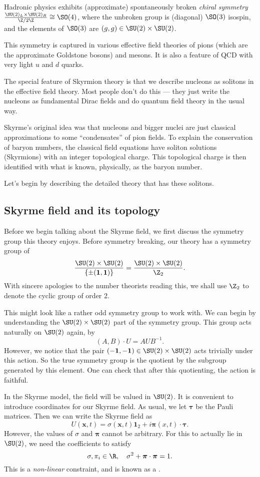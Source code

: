 \documentclass[a4paper]{article}
\begin{document}
Hadronic physics exhibits (approximate) spontaneously broken \emph{chiral symmetry} $\frac{\SU(2)_L \times \SU(2)_R}{\Z/2\Z} \cong \SO(4)$, where the unbroken group is (diagonal) $\SO(3)$ isospin, and the elements of $\SO(3)$ are $(g, g) \in \SU(2) \times \SU(2)$.

This symmetry is captured in various effective field theories of pions (which are the approximate Goldstone bosons) and mesons. It is also a feature of QCD with very light $u$ and $d$ quarks.

The special feature of Skyrmion theory is that we describe nucleons as solitons in the effective field theory. Most people don't do this --- they just write the nucleons as fundamental Dirac fields and do quantum field theory in the usual way.

Skyrme's original idea was that nucleons and bigger nuclei are just classical approximations to some ``condensates'' of pion fields. To explain the conservation of baryon numbers, the classical field equations have soliton solutions (Skyrmions) with an integer topological charge. This topological charge is then identified with what is known, physically, as the baryon number.

Let's begin by describing the detailed theory that has these solitons.
\subsection{Skyrme field and its topology}
Before we begin talking about the Skyrme field, we first discuss the symmetry group this theory enjoys. Before symmetry breaking, our theory has a symmetry group of
\[
  \frac{\SU(2) \times \SU(2)}{\{\pm (\mathbf{1}, \mathbf{1})\}} = \frac{\SU(2) \times \SU(2)}{\Z_2}.
\]
With sincere apologies to the number theorists reading this, we shall use $\Z_2$ to denote the cyclic group of order $2$.

This might look like a rather odd symmetry group to work with. We can begin by understanding the $\SU(2) \times \SU(2)$ part of the symmetry group. This group acts naturally on $\SU(2)$ again, by
\[
  (A, B) \cdot U = AUB^{-1}.
\]
However, we notice that the pair $(-\mathbf{1}, -\mathbf{1}) \in \SU(2) \times \SU(2)$ acts trivially under this action. So the true symmetry group is the quotient by the subgroup generated by this element. One can check that after this quotienting, the action is faithful.

In the Skyrme model, the field will be valued in $\SU(2)$. It is convenient to introduce coordinates for our Skyrme field. As usual, we let $\boldsymbol\tau$ be the Pauli matrices. Then we can write the Skyrme field as
\[
  U(\mathbf{x}, t) = \sigma(\mathbf{x}, t) \mathbf{1}_2 + i \boldsymbol\pi(x, t) \cdot \boldsymbol\tau.
\]
However, the values of $\sigma$ and $\boldsymbol\pi$ cannot be arbitrary. For this to actually lie in $\SU(2)$, we need the coefficients to satisfy
\[
  \sigma, \pi_i \in \R,\quad \sigma^2 + \boldsymbol\pi \cdot \boldsymbol\pi = 1.
\]
This is a \emph{non-linear} constraint, and is known as a .
\end{document}
